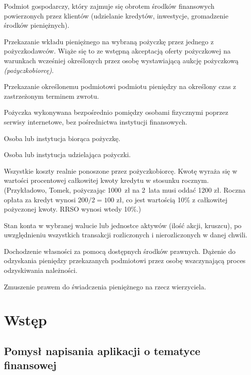 \documentclass[a4paper,twoside,titlepage,openright]{book}
\begin{document}
\begin{description}[style=nextline]
	\item[Instytucja finansowa] Podmiot gospodarczy, który zajmuje się obrotem środków finansowych powierzonych przez klientów (udzielanie kredytów, inwestycje, gromadzenie środków pieniężnych).
	\item[Oferta inwestycyjna] Przekazanie wkładu pieniężnego na wybraną pożyczkę przez jednego z pożyczkodawców. Wiąże się to ze wstępną akceptacją oferty pożyczkowej na warunkach wcześniej określonych przez osobę wystawiającą aukcję pożyczkową \textit{(pożyczkobiorcę)}.
	\item[Pożyczka] Przekazanie określonemu podmiotowi podmiotu pieniędzy na określony czas z zastrzeżonym terminem zwrotu. 
	\item[Pożyczka społecznościowa \textit{(ang. social lending)}] Pożyczka wykonywana bezpośrednio pomiędzy osobami fizycznymi poprzez serwisy internetowe, bez pośrednictwa instytucji finansowych.
	\item[Pożyczkobiorca] Osoba lub instytucja biorąca pożyczkę.\cite{slownikPwn}
	\item[Pożyczkodawca] Osoba lub instytucja udzielająca pożyczki.\cite{slownikPwn}
	\item[RRSO (Rzeczywista roczna stopa oprocentowania)] Wszystkie koszty realnie ponoszone przez pożyczkobiorcę. Kwotę wyraża się w wartości procentowej całkowitej kwoty kredytu w stosunku rocznym. (Przykładowo, Tomek, pożyczając 1000~zł na 2~lata musi oddać 1200 zł. Roczna opłata za kredyt wynosi $ 200 / 2 = 100 \text{ zł} $, co jest wartością 10\% z całkowitej pożyczonej kwoty. RRSO wynosi wtedy 10\%.)
	\item[Saldo] Stan konta w wybranej walucie lub jednostce aktywów (ilość akcji, kruszcu), po uwzględnieniu wszystkich transakcji rozliczonych i nierozliczonych w danej chwili.
	\item[Windykacja] Dochodzenie własności za pomocą dostępnych środków prawnych. Dążenie do odzyskania pieniędzy przekazanych podmiotowi przez osobę wszczynającą proces odzyskiwania należności.
	\item[Zobowiązania] Zmuszenie prawem do świadczenia pieniężnego na rzecz wierzyciela.
\end{description}
 
\chapter*{Wstęp}

\section*{Pomysł napisania aplikacji o tematyce finansowej}
\end{document}
